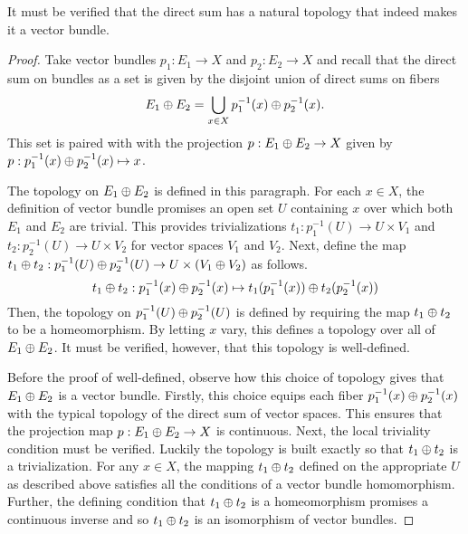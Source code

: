 \documentclass[../../sean_thesis.tex]{subfiles}
\begin{document}
It must be verified that the direct sum has a natural topology that indeed makes it a vector bundle.
	\begin{proof}
		Take vector bundles $p_1: E_1 \to X$ and $p_2: E_2 \to X$ and recall that the direct sum on bundles as a set is given by the disjoint union of direct sums on fibers
		\begin{equation*}
		E_1 \oplus E_2 = \bigcup_{x \in X} p_1^{-1}(x) \oplus p_2^{-1}(x).
		\end{equation*}
		This set is paired with with the projection $p: E_1 \oplus E_2 \to X$ given by $p: p_1^{-1}(x) \oplus p_2^{-1}(x) \mapsto x$.
		
		 The topology on $E_1 \oplus E_2$ is defined in this paragraph. For each $x \in X$, the definition of vector bundle promises an open set $U$ containing $x$ over which both $E_1$ and $E_2$ are trivial. This provides trivializations $t_1: p_1^{-1}(U) \to U \times V_1$ and $t_2: p_2^{-1}(U) \to U \times V_2$ for vector spaces $V_1$ and $V_2$. Next, define the map $t_1 \oplus t_2: p_1^{-1}(U) \oplus p_2^{-1}(U) \to U \times (V_1 \oplus V_2)$ as follows.
		\begin{equation*}
			t_1 \oplus t_2: p_1^{-1}(x) \oplus p_2^{-1}(x) \mapsto t_1(p_1^{-1}(x)) \oplus t_2(p_2^{-1}(x)) 
		\end{equation*}
Then, the topology on $p_1^{-1}(U) \oplus p_2^{-1}(U)$ is defined by requiring the map $t_1 \oplus t_2$ to be a homeomorphism. By letting $x$ vary, this defines a topology over all of $E_1 \oplus E_2$. It must be verified, however, that this topology is well-defined.

Before the proof of well-defined, observe how this choice of topology gives that $E_1 \oplus E_2$ is a vector bundle. Firstly, this choice equips each fiber $p_1^{-1}(x) \oplus p_2^{-1}(x)$ with the typical topology of the direct sum of vector spaces. This ensures that the projection map $p: E_1 \oplus E_2 \to X$ is continuous. Next, the local triviality condition must be verified. Luckily the topology is built exactly so that $t_1 \oplus t_2$ is a trivialization. For any $x \in X$, the mapping $t_1 \oplus t_2$ defined on the appropriate $U$ as described above satisfies all the conditions of a vector bundle homomorphism. Further, the defining condition that $t_1 \oplus t_2$ is a homeomorphism promises a continuous inverse and so $t_1 \oplus t_2$ is an isomorphism of vector bundles.


\end{proof}
\end{document}
